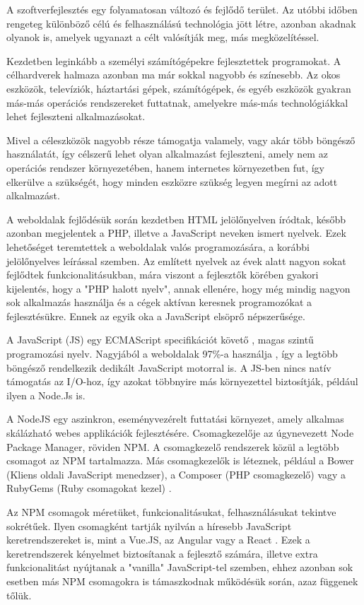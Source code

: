 
A szoftverfejlesztés egy folyamatosan változó és fejlődő terület. Az utóbbi időben rengeteg különböző célú és felhasználású technológia jött létre, azonban akadnak olyanok is, amelyek ugyanazt a célt valósítják meg, más megközelítéssel.

Kezdetben leginkább a személyi számítógépekre fejlesztettek programokat. A célhardverek halmaza azonban ma már sokkal nagyobb és színesebb. Az okos eszközök, televíziók, háztartási gépek, számítógépek, és egyéb eszközök gyakran más-más operációs rendszereket futtatnak, amelyekre más-más technológiákkal lehet fejleszteni alkalmazásokat.

Mivel a céleszközök nagyobb része támogatja valamely, vagy akár több böngésző használatát, így célszerű lehet olyan alkalmazást fejleszteni, amely nem az operációs rendszer környezetében, hanem internetes környezetben fut, így elkerülve a szükségét, hogy minden eszközre szükség legyen megírni az adott alkalmazást.

A weboldalak fejlődésük során kezdetben HTML jelölőnyelven íródtak, később azonban megjelentek a PHP, illetve a JavaScript neveken ismert nyelvek. Ezek  lehetőséget teremtettek a weboldalak valós programozására, a korábbi jelölőnyelves leírással szemben. Az említett nyelvek az évek alatt nagyon sokat fejlődtek funkcionalitásukban, mára viszont a fejlesztők körében gyakori kijelentés, hogy a "PHP halott nyelv", annak ellenére, hogy még mindig nagyon sok alkalmazás használja és a cégek aktívan keresnek programozókat a fejlesztésükre. Ennek az egyik oka a JavaScript elsöprő népszerűsége.

A  JavaScript (JS) egy ECMAScript specifikációt követő \cite{ecma}, magas szintű programozási nyelv. Nagyjából a weboldalak 97\%-a használja \cite{usage-stats}, így a legtöbb böngésző rendelkezik dedikált JavaScript motorral is. A JS-ben nincs natív támogatás az I/O-hoz, így azokat többnyire más környezettel biztosítják, például ilyen a Node.Js is. 

A NodeJS egy aszinkron, eseményvezérelt futtatási környezet, amely alkalmas skálázható webes applikációk fejlesztésére. Csomagkezelője az úgynevezett Node Package Manager, röviden NPM. A csomagkezelő rendszerek közül a legtöbb csomagot az NPM tartalmazza. Más csomagkezelők is léteznek, például a Bower (Kliens oldali JavaScript menedzser), a Composer (PHP csomagkezelő) vagy a RubyGems (Ruby csomagokat kezel) \cite{package-managers}.

Az NPM csomagok méretüket, funkcionalitásukat, felhasználásukat tekintve sokrétűek. Ilyen csomagként tartják nyilván a híresebb JavaScript keretrendszereket is, mint a Vue.JS, az Angular vagy a React \cite{frameworks}. Ezek a keretrendszerek kényelmet biztosítanak a fejlesztő számára, illetve extra funkcionalitást nyújtanak a "vanilla" JavaScript-tel szemben, ehhez azonban sok esetben más NPM csomagokra is támaszkodnak működésük során, azaz függenek tőlük.

